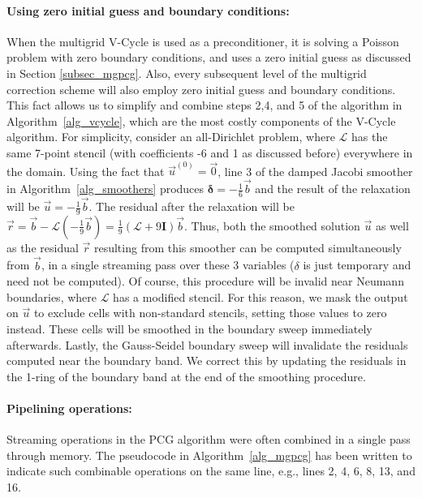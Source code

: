 \paragraph{Using zero initial guess and boundary conditions:} When the multigrid V-Cycle is used as a preconditioner, it is solving a Poisson problem with zero boundary conditions,
and uses a zero initial guess as discussed in Section \ref{subsec_mgpcg}. Also, every subsequent level of the multigrid correction scheme will also employ zero initial guess and
boundary conditions. This fact allows us to simplify and combine steps 2,4, and 5 of the algorithm in Algorithm~\ref{alg_vcycle}, which are the most costly components of the V-Cycle
algorithm. For simplicity, consider an all-Dirichlet problem, where $\mathcal{L}$ has the same 7-point stencil (with coefficients -6 and 1 as discussed before) everywhere in the
domain. Using the fact that $\vec{u}^{(0)}=\vec{0}$, line 3 of the damped Jacobi smoother in Algorithm~\ref{alg_smoothers} produces $\boldsymbol{\delta}=-\frac{1}{6}\vec{b}$ and the result of the
relaxation will be $\vec{u}=-\frac{1}{9}\vec{b}$. The residual after the relaxation will be
$\vec{r}=\vec{b}-\mathcal{L}(-\frac{1}{9}\vec{b})=\frac{1}{9}(\mathcal{L}+9\mathbf{I})\vec{b}$. Thus, both the smoothed solution $\vec{u}$ as well as the residual $\vec{r}$
resulting from this smoother can be computed simultaneously from $\vec{b}$, in a single streaming pass over these 3 variables ($\delta$ is just temporary and need not be computed).
Of course, this procedure will be invalid near Neumann boundaries, where $\mathcal{L}$ has a modified stencil. For this reason, we mask the output on $\vec{u}$ to exclude cells
with non-standard stencils, setting those values to zero instead. These cells will be smoothed in the boundary sweep immediately afterwards. Lastly, the Gauss-Seidel boundary
sweep will invalidate the residuals computed near the boundary band. We correct this by updating the residuals in the 1-ring of the boundary band at the end of the smoothing procedure.


\paragraph{Pipelining operations:} Streaming operations in the PCG algorithm  were often combined in a single pass through memory. The pseudocode in Algorithm~\ref{alg_mgpcg} has
been written to indicate such combinable operations on the same line, e.g., lines 2, 4, 6, 8, 13, and 16.

